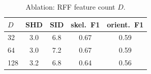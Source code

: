 \begin{table}[htbp]
\centering
\caption{Ablation: RFF feature count $D$.}
\label{tab:abl_features}
\begin{tabular}{lcccc}
\hline
$D$ & SHD & SID & skel.\ F1 & orient.\ F1 \\
\hline
32 & 3.0 & 6.8 & 0.67 & 0.59 \\
64 & 3.0 & 7.2 & 0.67 & 0.59 \\
128 & 3.2 & 6.8 & 0.64 & 0.56 \\
\hline
\end{tabular}
\end{table}
